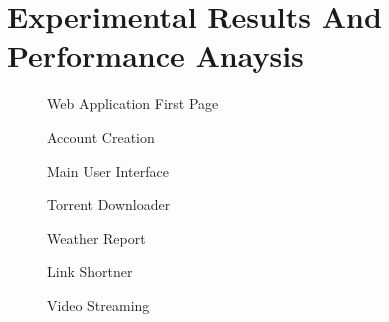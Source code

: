 \chapter{Experimental Results And Performance Anaysis}
\newpage

\break
\break


\begin{figure}[h]
\begin{center}
    \caption{Web Application First Page}
    \label{1}
\end{center}
\end{figure}
    
\begin{figure}[h]
\begin{center}
    \caption{Account Creation}
    \label{1}
\end{center}
\end{figure}
    
    
\begin{figure}[h]
\begin{center}
     \caption{Main User Interface}
    \label{1}
\end{center}
\end{figure}

\begin{figure}[h]
\begin{center}
    \caption{Torrent Downloader}
    \label{1}
\end{center}
\end{figure}


\begin{figure}[h]
\begin{center}
    \caption{Weather Report}
    \label{1}
\end{center}
\end{figure}


\begin{figure}[h]
\begin{center}
    \caption{Link Shortner}
    \label{1}
\end{center}
\end{figure}

\begin{figure}[h]
\begin{center}
    \caption{Video Streaming}
    \label{1}
\end{center}
\end{figure}
